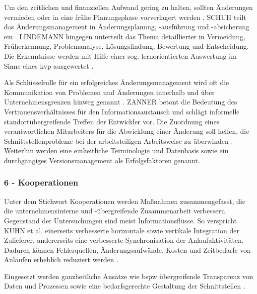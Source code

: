 Um den zeitlichen und finanziellen Aufwand gering zu halten, sollten Änderungen vermieden oder in eine frühe Planungsphase vorverlagert werden \autocite{Schuh2008, Jania2004, Ass98}. 
SCHUH teilt das Änderungsmanagement in Änderungsplanung, -ausführung und -absicherung ein \autocite[217]{Schuh2008}. 
LINDEMANN hingegen unterteilt das Thema detaillierter in Vermeidung, Früherkennung, Problemanalyse, Lösungsfindung, Bewertung und Entscheidung. Die Erkenntnisse werden mit Hilfe einer sog. lernorientierten Auswertung im Sinne eines \gls{kvp} ausgewertet \autocite{Lindemann1998}. 

Als Schlüsselrolle für ein erfolgreiches Änderungsmanagement wird oft die Kommunikation von Problemen und Änderungen innerhalb und über Unternehmensgrenzen hinweg genannt \autocite{Kuhn2002, Schuh2008}.
ZANNER betont die Bedeutung des Vertrauensverhältnisses für den Informationsaustausch und schlägt informelle standortübergreifende Treffen der Entwickler vor. Die Zuordnung eines verantwortlichen Mitarbeiters für die Abwicklung einer Änderung soll helfen, die Schnittstellenprobleme bei der arbeitsteiligen Arbeitsweise zu überwinden  \autocite[42]{Zanner2002}.
Weiterhin werden eine einheitliche Terminologie \autocite{Zanner2002} und Datenbasis sowie ein durchgängiges Versionsmanagement \autocite{Kuhn2002} als Erfolgsfaktoren genannt. 
\subsubsection*{6 - Kooperationen}
Unter dem Stichwort Kooperationen werden Maßnahmen zusammengefasst, die die unternehmensinterne und -übergreifende Zusammenarbeit verbessern. Gegenstand der Untersuchungen sind meist Informationsflüsse. 
So verspricht KUHN et al. einerseits verbesserte horizontale sowie vertikale Integration der Zulieferer, andererseits eine verbesserte Synchronisation der Anlaufaktivitäten. Dadurch können Fehlerquellen, Änderungsaufwände, Kosten und Zeitbedarfe von Anläufen erheblich reduziert werden \autocite[26]{Kuhn2002}. 

Eingesetzt werden ganzheitliche Ansätze wie \gls{bspw} übergreifende Transparenz von Daten und Prozessen sowie eine bedarfsgerechte Gestaltung der Schnittstellen \autocite{Kuhn2002}. 

